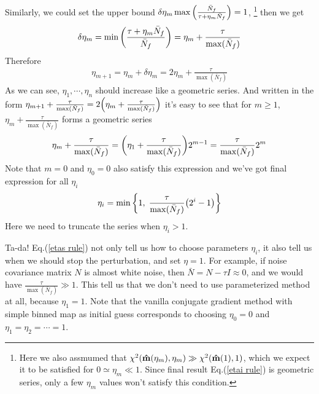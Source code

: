 \documentclass[11pt, letterpaper]{article}
\newcommand{\hatm}{\vb{\hat{m}}}
\newcommand{\Nbar}{\bar{N}}
\begin{document}
Similarly, we could set the upper bound
$\delta\eta_m \max \qty( \frac{\Nbar_f}{\tau + \eta_m \Nbar_f})=1$,
\footnote{Here we also assmumed that
$\chi^2(\hatm(\eta_m),\eta_m) \gg \chi^2(\hatm(1),1)$,
which we expect it to be satisfied for $0 \simeq \eta_m \ll 1$. 
Since final result Eq.(\ref{etai rule}) is geometric series,
only a few $\eta_m$ values won't satisfy this condition.
}
then we get
\begin{align}
\delta \eta_m 
= \min \qty(\frac{\tau + \eta_m \Nbar_f}{\Nbar_f})
= \eta_m + \frac{\tau }{\max(\Nbar_f)}
\end{align}
Therefore 
\begin{align}
\eta_{m+1} = \eta_m + \delta\eta_m = 2\eta_m + \frac{\tau }{\max (\Nbar_f)}
\end{align}
As we can see, $\eta_1, \cdots, \eta_n$ should increase like a geometric
series. 
And written in the form $\eta_{m+1} + \frac{\tau }{\max(\Nbar_f)}
= 2 \qty( \eta_m + \frac{\tau}{\max(\Nbar_f)})$
it's easy to see that for $m \geq 1$,
$\eta_{m} + \frac{\tau }{\max(\Nbar_f)}$ forms a geometric series
\begin{align}
\eta_m +  \frac{\tau }{\max(\Nbar_f)}
=\qty(\eta_1 + \frac{\tau }{\max(\Nbar_f)}) 2^{m-1}
=\frac{\tau}{\max(\Nbar_f)} 2^m
\end{align}
Note that $m = 0$ and $\eta_0 = 0$ also satisfy this expression and we've got
final expression for all $\eta_i$
\begin{align}
\eta_i =\min \qty\bigg{1,\; \frac{\tau}{\max(\Nbar_f)} \qty(2^i -1) }
\label{etai rule}
\end{align}
Here we need to truncate the series when $\eta_i > 1$.

Ta-da! Eq.(\ref{etas rule}) not only tell us how to choose parameters $\eta_i$,
it also tell us when we should stop the perturbation, and set $\eta = 1$.
For example, if noise covariance matrix $N$ is almost white noise,
then $\Nbar = N - \tau I \approx 0$,
and we would have $\frac{\tau}{\max(\Nbar_f)} \gg 1$.
This tell us that we don't need to use parameterized method at all, 
because $\eta_1 = 1$.
Note that the vanilla conjugate gradient method with simple binned map as
initial guess corresponds to choosing $\eta_0=0$ and $\eta_1= \eta_2 = \cdots
= 1$.
\end{document}

